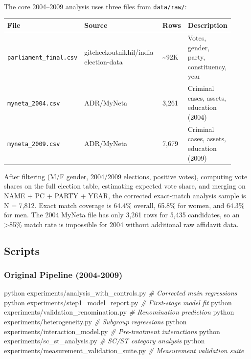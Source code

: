 \documentclass[
]{article}
\newenvironment{Shaded}{}{}
\newcommand{\CommentTok}[1]{\textcolor[rgb]{0.38,0.63,0.69}{\textit{#1}}}
\newcommand{\ExtensionTok}[1]{#1}
\newcommand{\NormalTok}[1]{#1}
\newcounter{none} %
\begin{document}
The core 2004--2009 analysis uses three files from \texttt{data/raw/}:

{\def\LTcaptype{none} %
\begin{longtable}[]{@{}p{0.22\linewidth}p{0.24\linewidth}p{0.09\linewidth}p{0.37\linewidth}@{}}
\toprule\noalign{}
File & Source & Rows & Description \\
\midrule\noalign{}
\endhead
\bottomrule\noalign{}
\endlastfoot
\texttt{parliament\_final.csv} & gitcheckoutnikhil/india-election-data & \textasciitilde92K & Votes, gender, party, constituency, year \\
\texttt{myneta\_2004.csv} & ADR/MyNeta & 3,261 & Criminal cases, assets, education (2004) \\
\texttt{myneta\_2009.csv} & ADR/MyNeta & 7,679 & Criminal cases, assets, education (2009) \\
\end{longtable}
}

After filtering (M/F gender, 2004/2009 elections, positive votes), computing vote shares on the full election table, estimating expected vote share, and merging on NAME + PC + PARTY + YEAR, the corrected exact-match analysis sample is N = 7,812. Exact match coverage is 64.4\% overall, 65.8\% for women, and 64.3\% for men. The 2004 MyNeta file has only 3,261 rows for 5,435 candidates, so an \textgreater85\% match rate is impossible for 2004 without additional raw affidavit data.

\subsection{Scripts}\label{scripts}

\subsubsection{Original Pipeline (2004-2009)}\label{original-pipeline-2004-2009}

\begin{Shaded}
\begin{Highlighting}[]
\ExtensionTok{python}\NormalTok{ experiments/analysis\_with\_controls.py          }\CommentTok{\# Corrected main regressions}
\ExtensionTok{python}\NormalTok{ experiments/step1\_model\_report.py              }\CommentTok{\# First{-}stage model fit}
\ExtensionTok{python}\NormalTok{ experiments/validation\_renomination.py         }\CommentTok{\# Renomination prediction}
\ExtensionTok{python}\NormalTok{ experiments/heterogeneity.py                   }\CommentTok{\# Subgroup regressions}
\ExtensionTok{python}\NormalTok{ experiments/interaction\_model.py               }\CommentTok{\# Pre{-}treatment interactions}
\ExtensionTok{python}\NormalTok{ experiments/sc\_st\_analysis.py                  }\CommentTok{\# SC/ST category analysis}
\ExtensionTok{python}\NormalTok{ experiments/measurement\_validation\_suite.py    }\CommentTok{\# Measurement validation suite}
\end{Highlighting}
\end{Shaded}
\end{document}
